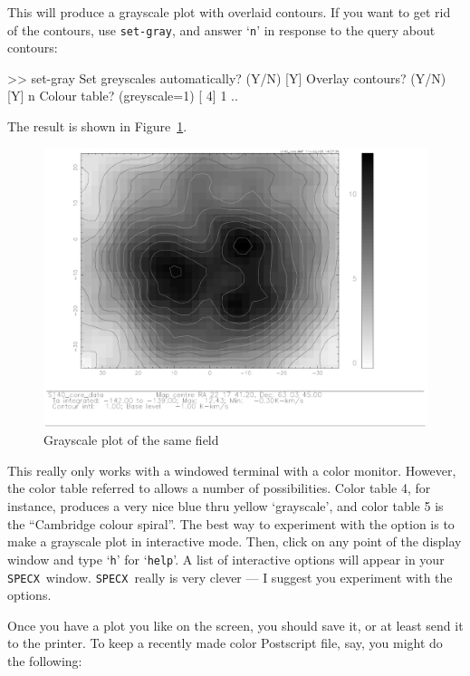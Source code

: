 \documentclass[11pt,twoside]{starlink}
\providecommand{\SPECX}{\texttt{SPECX}}
\begin{document}
This will produce a grayscale plot with overlaid contours. If you want
to get rid of the contours, use \texttt{set-gray}, and answer `\texttt{n}'
in response to the query about contours:

\begin{terminalv}
>> set-gray
Set greyscales automatically? (Y/N) [Y]
Overlay contours? (Y/N) [Y] n
Colour table? (greyscale=1) [ 4] 1
..
\end{terminalv}

The result is shown in Figure~\ref{fig:specx_gray}.

\begin{figure}[htb]
\centering
\includegraphics[width=\textwidth]{sc8_gray}
\caption[A gray-scale plot with contours]
{\small{Grayscale plot of the same field}
}
\label{fig:specx_gray}
\end{figure}

This really only works with a windowed terminal with a color
monitor. However, the color table referred to allows a number of
possibilities. Color table 4, for instance, produces a very nice blue
thru yellow `grayscale', and color table 5 is the ``Cambridge colour
spiral''. The best way to experiment with the option is to make a
grayscale plot in interactive mode.  Then, click on any point of the
display window and type `\texttt{h}' for `\texttt{help}'. A list of
interactive options will appear in your \SPECX\ window. \SPECX\ really
is very clever --- I suggest you experiment with the options.

Once you have a plot you like on the screen, you should save it, or at
least send it to the printer. To keep a recently made color Postscript
file, say, you might do the following:
\end{document}
